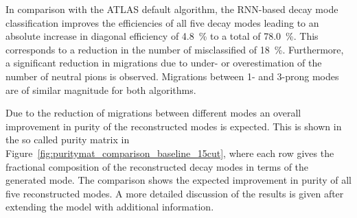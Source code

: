 In comparison with the ATLAS default algorithm, the RNN-based decay mode
classification improves the efficiencies of all five decay modes leading to an
absolute increase in diagonal efficiency of \SI{4.8}{\percent} to a total of
\SI{78.0}{\percent}. This corresponds to a reduction in the number of
misclassified \tauhadvis of \SI{18}{\percent}. Furthermore, a significant
reduction in migrations due to under- or overestimation of the number of neutral
pions is observed. Migrations between 1- and 3-prong modes are of similar
magnitude for both algorithms.

Due to the reduction of migrations between different modes an overall
improvement in purity of the reconstructed modes is expected. This is shown in
the so called purity matrix in
Figure~\ref{fig:puritymat_comparison_baseline_15cut}, where each row gives the
fractional composition of the reconstructed decay modes in terms of the
generated mode. The comparison shows the expected improvement in purity of all
five reconstructed modes. A more detailed discussion of the results is given
after extending the model with additional information.

